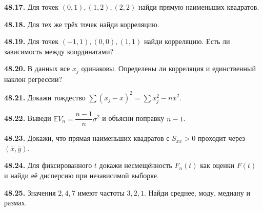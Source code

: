\noindent\begin{minipage}[t]{\linewidth}\textbf{48.17.} Для точек \((0,1),(1,2),(2,2)\) найди прямую наименьших квадратов.\par\end{minipage}\par
\noindent\begin{minipage}[t]{\linewidth}\textbf{48.18.} Для тех же трёх точек найди корреляцию.\par\end{minipage}\par
\noindent\begin{minipage}[t]{\linewidth}\textbf{48.19.} Для точек \((-1,1),(0,0),(1,1)\) найди корреляцию. Есть ли зависимость между координатами?\par\end{minipage}\par
\noindent\begin{minipage}[t]{\linewidth}\textbf{48.20.} В данных все \(x_j\) одинаковы. Определены ли корреляция и единственный наклон регрессии?\par\end{minipage}\par
\noindent\begin{minipage}[t]{\linewidth}\textbf{48.21.} Докажи тождество \(\sum(x_j-\overline x)^2=\sum x_j^2-n\overline x^2\).\par\end{minipage}\par
\noindent\begin{minipage}[t]{\linewidth}\textbf{48.22.}\starmark{} Выведи \(\mathbb EV_n=\dfrac{n-1}{n}\sigma^2\) и объясни поправку \(n-1\).\par\end{minipage}\par
\noindent\begin{minipage}[t]{\linewidth}\textbf{48.23.} Докажи, что прямая наименьших квадратов с \(S_{xx}>0\) проходит через \((\overline x,\overline y)\).\par\end{minipage}\par
\noindent\begin{minipage}[t]{\linewidth}\textbf{48.24.}\starmark{} Для фиксированного \(t\) докажи несмещённость \(F_n(t)\) как оценки \(F(t)\) и найди её дисперсию при независимой выборке.\par\end{minipage}\par
\noindent\begin{minipage}[t]{\linewidth}\textbf{48.25.} Значения \(2,4,7\) имеют частоты \(3,2,1\). Найди среднее, моду, медиану и размах.\par\end{minipage}\par
